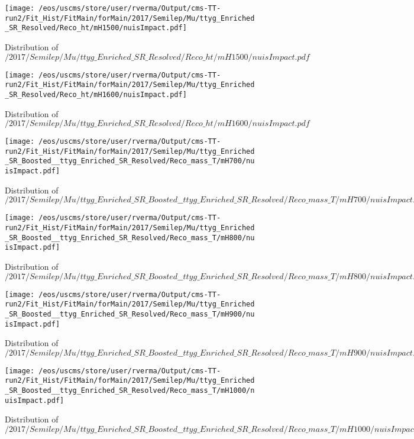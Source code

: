 \begin{figure}
\centering
\texttt{[image: /eos/uscms/store/user/rverma/Output/cms-TT-run2/Fit\_Hist/FitMain/forMain/2017/Semilep/Mu/ttyg\_Enriched\_SR\_Resolved/Reco\_ht/mH1500/nuisImpact.pdf]}
\caption{Distribution of $/2017/Semilep/Mu/ttyg\_Enriched\_SR\_Resolved/Reco\_ht/mH1500/nuisImpact.pdf$}
\end{figure}

\begin{figure}
\centering
\texttt{[image: /eos/uscms/store/user/rverma/Output/cms-TT-run2/Fit\_Hist/FitMain/forMain/2017/Semilep/Mu/ttyg\_Enriched\_SR\_Resolved/Reco\_ht/mH1600/nuisImpact.pdf]}
\caption{Distribution of $/2017/Semilep/Mu/ttyg\_Enriched\_SR\_Resolved/Reco\_ht/mH1600/nuisImpact.pdf$}
\end{figure}

\begin{figure}
\centering
\texttt{[image: /eos/uscms/store/user/rverma/Output/cms-TT-run2/Fit\_Hist/FitMain/forMain/2017/Semilep/Mu/ttyg\_Enriched\_SR\_Boosted\_\_ttyg\_Enriched\_SR\_Resolved/Reco\_mass\_T/mH700/nuisImpact.pdf]}
\caption{Distribution of $/2017/Semilep/Mu/ttyg\_Enriched\_SR\_Boosted\_\_ttyg\_Enriched\_SR\_Resolved/Reco\_mass\_T/mH700/nuisImpact.pdf$}
\end{figure}

\begin{figure}
\centering
\texttt{[image: /eos/uscms/store/user/rverma/Output/cms-TT-run2/Fit\_Hist/FitMain/forMain/2017/Semilep/Mu/ttyg\_Enriched\_SR\_Boosted\_\_ttyg\_Enriched\_SR\_Resolved/Reco\_mass\_T/mH800/nuisImpact.pdf]}
\caption{Distribution of $/2017/Semilep/Mu/ttyg\_Enriched\_SR\_Boosted\_\_ttyg\_Enriched\_SR\_Resolved/Reco\_mass\_T/mH800/nuisImpact.pdf$}
\end{figure}

\begin{figure}
\centering
\texttt{[image: /eos/uscms/store/user/rverma/Output/cms-TT-run2/Fit\_Hist/FitMain/forMain/2017/Semilep/Mu/ttyg\_Enriched\_SR\_Boosted\_\_ttyg\_Enriched\_SR\_Resolved/Reco\_mass\_T/mH900/nuisImpact.pdf]}
\caption{Distribution of $/2017/Semilep/Mu/ttyg\_Enriched\_SR\_Boosted\_\_ttyg\_Enriched\_SR\_Resolved/Reco\_mass\_T/mH900/nuisImpact.pdf$}
\end{figure}

\begin{figure}
\centering
\texttt{[image: /eos/uscms/store/user/rverma/Output/cms-TT-run2/Fit\_Hist/FitMain/forMain/2017/Semilep/Mu/ttyg\_Enriched\_SR\_Boosted\_\_ttyg\_Enriched\_SR\_Resolved/Reco\_mass\_T/mH1000/nuisImpact.pdf]}
\caption{Distribution of $/2017/Semilep/Mu/ttyg\_Enriched\_SR\_Boosted\_\_ttyg\_Enriched\_SR\_Resolved/Reco\_mass\_T/mH1000/nuisImpact.pdf$}
\end{figure}

